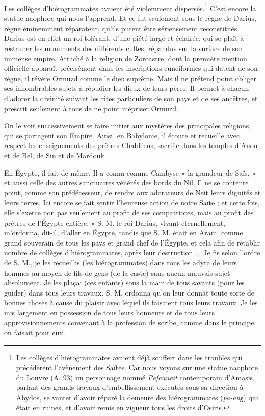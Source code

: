 \documentclass[letterpaper,twocolumn,openany,nodeprecatedcode]{dndbook}
\begin{document}
Les collèges d'hiérogrammates avaient été violemment dispersés.\footnote{Les collèges d'hiérogrammates avaient déjà souffert dans les troubles qui précédèrent l'avènement des Saïtes. Car nous voyons sur une statue naophore du Louvre (A. 93) un personnage nommé \emph{Pefaaneit} contemporain d'Amasis, parlant des grands travaux d'embellissement exécutés sous sa direction à Abydos, se vanter d'avoir réparé la demeure des hiérogrammates (\emph{pa-anχ}) qui était en ruines, et d'avoir remis en vigueur tous les droits d'Osiris.} C'est encore la statue naophore qui nous l'apprend. Et ce fut seulement sous le règne de Darius, règne éminemment réparateur, qu'ils purent être sérieusement reconstitués. Darius est en effet un roi tolérant, d'une piété large et éclairée, qui se plaît à restaurer les monuments des différents cultes, répandus sur la surface de son immense empire. Attaché à la religion de Zoroastre, dont la première mention officielle apparaît précisément dans les inscriptions cunéiformes qui datent de son règne, il révère Ormuzd comme le dieu suprême. Mais il ne prétend point obliger ses innombrables sujets à répudier les dieux de leurs pères. Il permet à chacun d'adorer la divinité suivant les rites particuliers de son pays et de ses ancêtres, et prescrit seulement à tous de ne point mépriser Ormuzd.

On le voit successivement se faire initier aux mystères des principales religions, qui se partagent son Empire. Ainsi, en Babylonie, il écoute et recueille avec respect les enseignements des prêtres Chaldéens, sacrifie dans les temples d'Anou et de Bel, de Sin et de Mardouk.

En Égypte, il fait de même. Il a connu comme Cambyse « la grandeur de Saïs, » et aussi celle des autres sanctuaires vénérés des bords du Nil. Il ne se contente point, comme son prédécesseur, de rendre aux adorateurs de Neit leurs dignités et leurs terres. Ici encore se fait sentir l'heureuse action de notre Saïte ; et cette fois, elle s'exerce non pas seulement au profit de ses compatriotes, mais au profit des prêtres de l'Égypte entière. « S. M. le roi Darius, vivant éternellement, m'ordonna, dit-il, d'aller en Égypte, tandis que S. M. était en Aram, comme grand souverain de tous les pays et grand chef de l'Égypte, et cela afin de rétablir nombre de collèges d'hiérogrammates, après leur destruction ... Je fis selon l'ordre de S. M., je les recueillis (les hiérogrammates) dans tous les adyta de leurs hommes au moyen de fils de gens (de la caste) sans aucun mauvais sujet absolument. Je les plaçai (ces enfants) sous la main de tous savants (pour les guider) dans tous leurs travaux. S. M. ordonna qu'on leur donnât toute sorte de bonnes choses à cause du plaisir avec lequel ils faisaient tous leurs travaux. Je les mis largement en possession de tous leurs honneurs et de tous leurs approvisionnements convenant à la profession de scribe, comme dans le principe on faisait pour eux.
\end{document}
